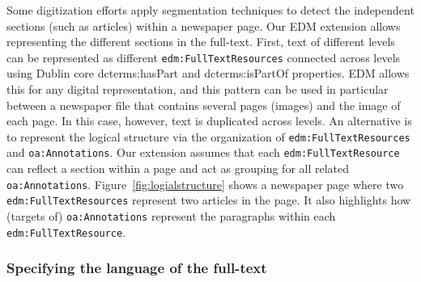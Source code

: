 \documentclass[a4paper,UKenglish,cleveref, autoref]{oasics-v2019}
\begin{document}
Some digitization efforts apply segmentation techniques to detect the independent sections (such as articles) within a newspaper page. Our EDM extension allows representing the different sections in the full-text. First, text of different levels can be represented as different \verb+edm:FullTextResources+ connected across levels using Dublin core dcterms:hasPart and dcterms:isPartOf properties. EDM allows this for any digital representation, and this pattern can be used in particular between a newspaper file that contains several pages (images) and the image of each page. In this case, however, text is duplicated across levels. An alternative is to represent the logical structure via the organization of \verb+edm:FullTextResources+ and \verb+oa:Annotations+. Our extension assumes that each \verb+edm:FullTextResource+ can reflect a section within a page and act as  grouping for all related \verb+oa:Annotations+. Figure~\ref{fig:logialstructure} shows a newspaper page where two \verb+edm:FullTextResources+ represent two articles in the page. It also highlights how (targets of) \verb+oa:Annotations+ represent the paragraphs within each \verb+edm:FullTextResource+.

\subsubsection{Specifying the language of the full-text}
\end{document}

